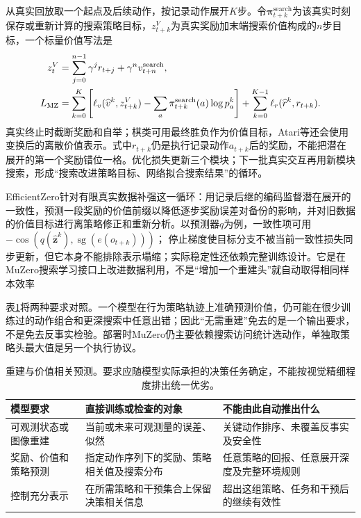 从真实回放取一个起点及后续动作，按记录动作展开$K$步。令$\bm\pi^{\mathrm{search}}_{t+k}$为该真实时刻保存或重新计算的搜索策略目标，$z^V_{t+k}$为真实奖励加末端搜索价值构成的$n$步目标，一个标量价值写法是
\begin{align}
  z^V_t&=\sum_{j=0}^{n-1}\gamma^j r_{t+j}
                     +\gamma^n v^{\mathrm{search}}_{t+n}, \notag\\
  L_{\mathrm{MZ}}
    &=\sum_{k=0}^{K}
       \left[\ell_v(\widehat v^k,z^V_{t+k})
            -\sum_a\pi^{\mathrm{search}}_{t+k}(a)\log p^k_a\right]
      +\sum_{k=0}^{K-1}\ell_r(\widehat r^k,r_{t+k}).
  \label{eq:rl-learning-muzero-loss}
\end{align}
真实终止时截断奖励和自举；棋类可用最终胜负作为价值目标，Atari等还会使用变换后的离散价值表示。式中$r_{t+k}$仍是执行记录动作$a_{t+k}$后的奖励，不能把潜在展开的第一个奖励错位一格。优化损失更新三个模块；下一批真实交互再用新模块搜索，形成“搜索改进策略目标、网络拟合搜索结果”的循环。

EfficientZero针对有限真实数据补强这一循环：用记录后继的编码监督潜在展开的一致性，预测一段奖励的价值前缀以降低逐步奖励误差对备份的影响，并对旧数据的价值目标进行离策略修正和重新分析。以预测器$q$为例，一致性项可用
$-\operatorname{cos}(q(\widehat{\bm z}^{k}),\operatorname{sg}(e(o_{t+k})))$；
停止梯度使目标分支不被当前一致性损失同步更新，但它本身不能排除表示塌缩；实际稳定性还依赖完整训练设计。它是在MuZero搜索学习接口上改进数据利用，不是“增加一个重建头”就自动取得相同样本效率

表\ref{tab:rl-learning-model-requirements}将两种要求对照。一个模型在行为策略轨迹上准确预测价值，仍可能在很少训练过的动作组合和更深搜索中任意出错；因此“无需重建”免去的是一个输出要求，不是免去反事实检验。部署时MuZero仍主要依赖搜索访问统计选动作，单独取策略头最大值是另一个执行协议。

\begin{table}[t]
  \centering
  \small
  \begin{tabularx}{\linewidth}{>{\raggedright\arraybackslash}p{26mm} >{\raggedright\arraybackslash}X >{\raggedright\arraybackslash}X}
    \toprule
    模型要求 & 直接训练或检查的对象 & 不能由此自动推出什么 \\
    \midrule
    可观测状态或图像重建 & 当前或未来可观测量的误差、似然 & 关键动作排序、未覆盖反事实及安全性 \\
    奖励、价值和策略预测 & 指定动作序列下的奖励、策略相关值及搜索分布 & 任意策略的回报、任意展开深度及完整环境规则 \\
    控制充分表示 & 在所需策略和干预集合上保留决策相关信息 & 超出这组策略、任务和干预后的继续有效性 \\
    \bottomrule
  \end{tabularx}
  \caption{重建与价值相关预测。要求应随模型实际承担的决策任务确定，不能按视觉精细程度排出统一优劣。}
  \label{tab:rl-learning-model-requirements}
\end{table}

